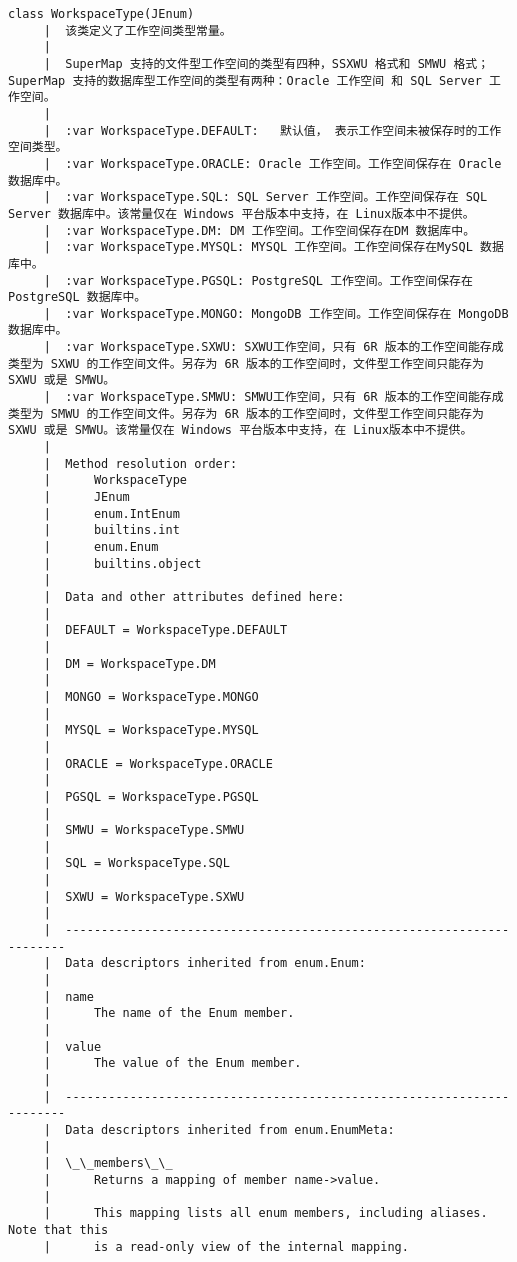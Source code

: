 \documentclass[11pt]{article}
\begin{document}
\begin{Verbatim}[commandchars=\\\{\}]
    class WorkspaceType(JEnum)
     |  该类定义了工作空间类型常量。
     |  
     |  SuperMap 支持的文件型工作空间的类型有四种，SSXWU 格式和 SMWU 格式；SuperMap 支持的数据库型工作空间的类型有两种：Oracle 工作空间 和 SQL Server 工作空间。
     |  
     |  :var WorkspaceType.DEFAULT:   默认值， 表示工作空间未被保存时的工作空间类型。
     |  :var WorkspaceType.ORACLE: Oracle 工作空间。工作空间保存在 Oracle 数据库中。
     |  :var WorkspaceType.SQL: SQL Server 工作空间。工作空间保存在 SQL Server 数据库中。该常量仅在 Windows 平台版本中支持，在 Linux版本中不提供。
     |  :var WorkspaceType.DM: DM 工作空间。工作空间保存在DM 数据库中。
     |  :var WorkspaceType.MYSQL: MYSQL 工作空间。工作空间保存在MySQL 数据库中。
     |  :var WorkspaceType.PGSQL: PostgreSQL 工作空间。工作空间保存在PostgreSQL 数据库中。
     |  :var WorkspaceType.MONGO: MongoDB 工作空间。工作空间保存在 MongoDB 数据库中。
     |  :var WorkspaceType.SXWU: SXWU工作空间，只有 6R 版本的工作空间能存成类型为 SXWU 的工作空间文件。另存为 6R 版本的工作空间时，文件型工作空间只能存为 SXWU 或是 SMWU。
     |  :var WorkspaceType.SMWU: SMWU工作空间，只有 6R 版本的工作空间能存成类型为 SMWU 的工作空间文件。另存为 6R 版本的工作空间时，文件型工作空间只能存为 SXWU 或是 SMWU。该常量仅在 Windows 平台版本中支持，在 Linux版本中不提供。
     |  
     |  Method resolution order:
     |      WorkspaceType
     |      JEnum
     |      enum.IntEnum
     |      builtins.int
     |      enum.Enum
     |      builtins.object
     |  
     |  Data and other attributes defined here:
     |  
     |  DEFAULT = WorkspaceType.DEFAULT
     |  
     |  DM = WorkspaceType.DM
     |  
     |  MONGO = WorkspaceType.MONGO
     |  
     |  MYSQL = WorkspaceType.MYSQL
     |  
     |  ORACLE = WorkspaceType.ORACLE
     |  
     |  PGSQL = WorkspaceType.PGSQL
     |  
     |  SMWU = WorkspaceType.SMWU
     |  
     |  SQL = WorkspaceType.SQL
     |  
     |  SXWU = WorkspaceType.SXWU
     |  
     |  ----------------------------------------------------------------------
     |  Data descriptors inherited from enum.Enum:
     |  
     |  name
     |      The name of the Enum member.
     |  
     |  value
     |      The value of the Enum member.
     |  
     |  ----------------------------------------------------------------------
     |  Data descriptors inherited from enum.EnumMeta:
     |  
     |  \_\_members\_\_
     |      Returns a mapping of member name->value.
     |      
     |      This mapping lists all enum members, including aliases. Note that this
     |      is a read-only view of the internal mapping.
    

\end{Verbatim}
\end{document}

